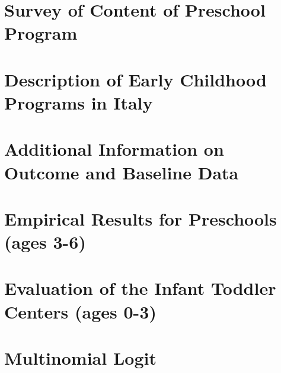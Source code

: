 \begin{appendices}

\section{Survey of Content of Preschool Program}
\label{sec:survey}


\section{Description of Early Childhood Programs in Italy}
\label{sec:programdes}


\section{Additional Information on Outcome and Baseline Data}
\label{sec:data-app}


\section{Empirical Results for Preschools (ages 3-6)}
\label{sec:results}


\section{Evaluation of the Infant Toddler Centers (ages 0-3)} \label{sec:ITC}

\label{sec:asilo_results}


\section{Multinomial Logit}
\label{sec:multi-logit}

\clearpage


%

\end{appendices}






